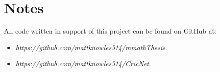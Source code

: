 \documentclass[11pt]{report}
\begin{document}
\section*{Notes}
All code written in support of this project can be found on GitHub at: \\
\begin{itemize}
    \item \textit{https://github.com/mattknowles314/mmathThesis}. 
    \item \textit{https://github.com/mattknowles314/CricNet}.
\end{itemize}


\setcounter{tocdepth}{3}
\tableofcontents
\setcounter{tocdepth}{1}
\listoffigures


















\appendix








{}
\end{document}
